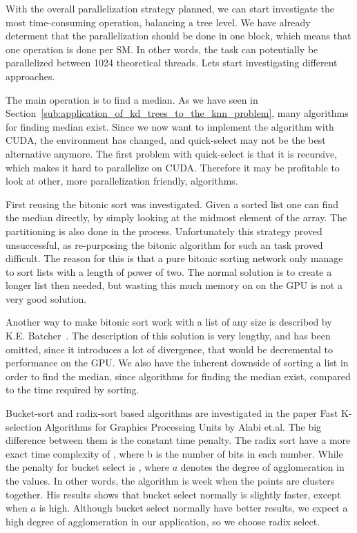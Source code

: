 With the overall parallelization strategy planned, we can start investigate the most time-consuming operation, balancing a tree level. We have already determent that the parallelization should be done in one block, which means that one operation is done per SM\@. In other words, the task can potentially be parallelized between 1024 theoretical threads. Lets start investigating different approaches.

The main operation is to find a median. As we have seen in Section~\ref{sub:application_of_kd_trees_to_the_knn_problem}, many algorithms for finding median exist. Since we now want to implement the algorithm with CUDA, the environment has changed, and quick-select may not be the best alternative anymore. The first problem with quick-select is that it is recursive, which makes it hard to parallelize on CUDA\@. Therefore it may be profitable to look at other, more parallelization friendly, algorithms.

First reusing the bitonic sort was investigated. Given a sorted list one can find the median directly, by simply looking at the midmost element of the array. The partitioning is also done in the process. Unfortunately this strategy proved unsuccessful, as re-purposing the bitonic algorithm for such an task proved difficult. The reason for this is that a pure bitonic sorting network only manage to sort lists with a length of power of two. The normal solution is to create a longer list then needed, but wasting this much memory on on the GPU is not a very good solution. 

Another way to make bitonic sort work with a list of any size is described by K.E. Batcher~\cite{Batcher:1968}. The description of this solution is very lengthy, and has been omitted, since it introduces a lot of divergence, that would be decremental to performance on the GPU\@. We also have the inherent downside of sorting a list in order to find the median, since  algorithms for finding the median exist, compared to the  time required by sorting.

Bucket-sort and radix-sort based algorithms are investigated in the paper Fast K-selection Algorithms for Graphics Processing Units by Alabi et.al\citep{Alabi:2012}. The big difference between them is the constant time penalty. The radix sort have a more exact time complexity of , where b is the number of bits in each number. While the penalty for bucket select is , where $a$ denotes the degree of agglomeration in the values. In other words, the algorithm is week when the points are clusters together. His results shows that bucket select normally is slightly faster, except when $a$ is high. Although bucket select normally have better results, we expect a high degree of agglomeration in our application, so we choose radix select.

